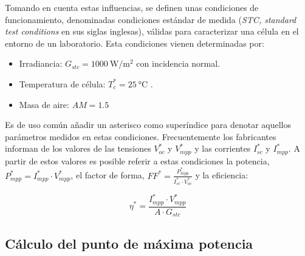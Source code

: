 Tomando en cuenta estas influencias, se definen unas condiciones de
funcionamiento, denominadas condiciones estándar de medida (\emph{STC,
standard test conditions} en sus siglas inglesas), válidas para caracterizar
una célula en el entorno de un laboratorio. Esta condiciones vienen
determinadas por:
\begin{itemize}
\item Irradiancia: $G_{stc}=\SI{1000}{\watt\per\meter\squared}$ con incidencia
normal.  
\item Temperatura de célula: $T_{c}^{*}=\SI{25}{\celsius}$  
 .
\item Masa de aire: $AM=1.5$
\end{itemize}
Es de uso común añadir un asterisco como superíndice para denotar
aquellos parámetros medidos en estas condiciones. Frecuentemente los
fabricantes informan de los valores de las tensiones $V_{oc}^{*}$
y $V_{mpp}^{*}$ y las corrientes $I_{sc}^{*}$ y $I_{mpp}^{*}$.
A partir de estos valores es posible referir a estas condiciones la
potencia, $P_{mpp}^{*}=I_{mpp}^{*}\cdot V_{mpp}^{*}$, el factor de
forma, $FF^{*}=\frac{P_{mpp}^{*}}{I_{sc}^{*}\cdot V_{oc}^{*}}$
y la eficiencia:

\begin{equation}
\eta^{*}=\frac{I_{mpp}^{*}\cdot V_{mpp}^{*}}{A\cdot G_{stc}}\label{eq:EficienciaCelula_STC}\end{equation}


\subsection{Cálculo del punto de máxima potencia\label{sub:CalculoMaximaPotencia}}

